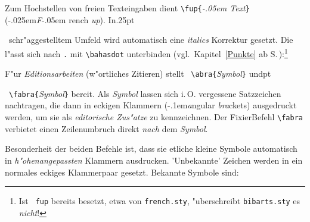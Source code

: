 \documentclass[12pt,a4paper]{article}
\newcommand{\pdfko}[1]{\kern #1pt
                          \strut\ignorespaces}%
\newcommand{\pbs}{\string\ \unskip}
\newcommand{\bs}{\protect\pbs}
\begin{document}

\vspace{1.25ex}\noindent
Zum Hochstellen von freien Texteingaben dient 
\verb|\fup{|\textit{\kern-.05em Text}\verb|}| 
\hspace{.2em}(\kern-.025em\textit{F}\kern-.05em rench \textit{up}). In\pdfko{.25}\  
schr"aggestelltem Umfeld wird automatisch eine \textit{italics}\hy
Korrektur gesetzt. Die l"asst sich nach \hspace{-.1em}\verb|.| mit \verb|\bahasdot| 
unterbinden (vgl.\ Kapitel~\ref{Punkte} ab 
S.\,\pageref{Punkte}):\footnote{Ist \texttt{\bs fup} bereits 
besetzt, etwa von \texttt{french.sty}, 
"uberschreibt \texttt{bibarts.sty} es \textit{nicht}!} 



\newpage\noindent
F"ur \textit{Editionsarbeiten} (w"ortliches Zitieren) stellt \BibArts\ 
\verb|\abra{|\textit{Symbol}\verb|}| und\pdfko{1}\
\verb|\fabra{|\textit{Symbol}\verb|}| 
bereit. Als \textit{Symbol} lassen sich i.\,O. vergessene Satzzeichen 
nachtragen, die dann in eckigen Klammern (\kern-.1em\textit{a}ngular \textit{bra}ckets) 
ausgedruckt werden, um sie als \textit{editorische Zus"atze} zu kennzeichnen. 
Der Fixier\hy Befehl \verb|\fabra| verbietet einen Zeilenumbruch direkt
\textit{nach} dem \textit{Symbol}. 

Besonderheit der beiden Befehle ist, dass sie etliche kleine Symbole 
automatisch in \textit{h"ohenangepassten} Klammern ausdrucken. 'Unbekannte' 
Zeichen werden in ein normales eckiges Klammerpaar gesetzt. Bekannte Symbole sind:
\end{document}

